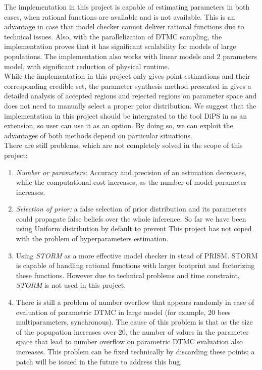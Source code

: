 \documentclass[12pt]{article}
\theoremstyle{definition}
\begin{document}
The implementation in this project is capable of estimating parameters in both
cases, when rational functions are available and is not available. This is an
advantage in case that model checker cannot deliver rational functions due to
technical issues. Also, with the parallelization of DTMC sampling, the
implementation proves that it has significant scalability for models of large
populations. The implementation also works with linear models and 2 parameters
model, with significant reduction of physical runtime.\\

While the implementation in this project only gives point estimations and their
corresponding credible set, the parameter synthesis method presented in
\cite{hajnal2019data} gives a detailed analysis of accepted regions and rejected
regions on parameter space and does not need to manually select a proper prior
distribution. We suggest that the implementation in this project should be
intergrated to the tool DiPS in \cite{hajnal2019data} as an extension, so user
can use it as an option. By doing so, we can exploit the advantages of both
methods depend on particular situations.\\
There are still problems, which are not completely solved in the scope of this
project:
\begin{enumerate}
\item \textit{Number or parameters}: Accuracy and precision of an estimation
  decreases, while the computational cost increases, as the number of model
  parameter increases.
\item \textit{Selection of prior:} a false selection of prior distribution and
  its parameters could propagate false beliefs over the whole inference. So far
  we have been using Uniform distribution by default to prevent 
  This project has not coped with the problem of hyperparameters
  estimation.
\item Using \textit{STORM} \cite{dehnert2017storm} as a more effective model
  checker in stead of PRISM. STORM is capable of handling rational functions
  with larger footprint and factorizing these functions. However due to
  technical problems and time constraint, \textit{STORM} is not used in this
  project.
\item There is still a problem of number overflow that appears randomly in case
  of evaluation of parametric DTMC in large model (for example, 20 bees
  multiparameters, synchronous). The cause of this problem is that as the size
  of the popupation increases over 20, the number of values in the parameter
  space that lead to number overflow on parametric DTMC evaluation also
  increases. This problem can be fixed technically by discarding these points; a
  patch will be issued in the future to address this bug.
\end{enumerate}

\newpage
\printbibliography
\end{document}
